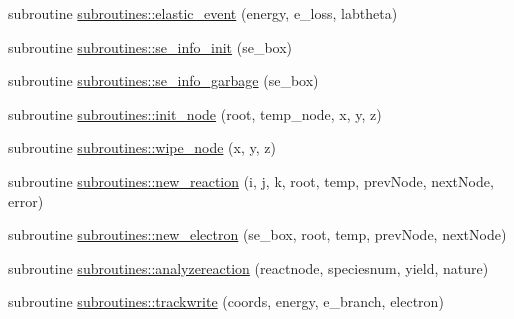 \begin{DoxyCompactItemize}
\item 
subroutine \hyperlink{namespacesubroutines_a10f3c575d44eedaf9b0a95ed9a64e3ab}{subroutines::elastic\_\-event} (energy, e\_\-loss, labtheta)
\item 
subroutine \hyperlink{namespacesubroutines_aece587c9d144811189bd1ccf8a59f189}{subroutines::se\_\-info\_\-init} (se\_\-box)
\item 
subroutine \hyperlink{namespacesubroutines_a1d1775ee81394d8c078c760678a530e2}{subroutines::se\_\-info\_\-garbage} (se\_\-box)
\item 
subroutine \hyperlink{namespacesubroutines_a4d9b1fbbdcfc2b420201a7ca71c4e782}{subroutines::init\_\-node} (root, temp\_\-node, x, y, z)
\item 
subroutine \hyperlink{namespacesubroutines_a7580fc0416f20d44b3cfa79ebc20a839}{subroutines::wipe\_\-node} (x, y, z)
\item 
subroutine \hyperlink{namespacesubroutines_a5f9a688681311ebc691561ec51015d0f}{subroutines::new\_\-reaction} (i, j, k, root, temp, prevNode, nextNode, error)
\item 
subroutine \hyperlink{namespacesubroutines_ae942148085820c335aea6798ad4e7e7e}{subroutines::new\_\-electron} (se\_\-box, root, temp, prevNode, nextNode)
\item 
subroutine \hyperlink{namespacesubroutines_aae3cb4fad8f95b0869777449a6bc496f}{subroutines::analyzereaction} (reactnode, speciesnum, yield, nature)
\item 
subroutine \hyperlink{namespacesubroutines_abbce0f7ec92c43ac91db25f512531642}{subroutines::trackwrite} (coords, energy, e\_\-branch, electron)
\end{DoxyCompactItemize}
